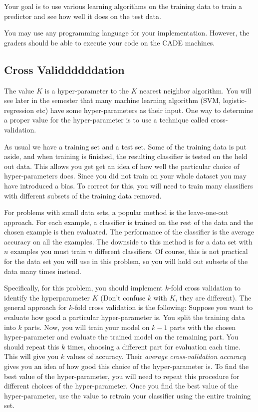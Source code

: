 \documentclass[listings, listings-bw, listings-color, listings-sv]{article}
\begin{document}
Your goal is to use various learning algorithms on the training data to train a predictor and see how well it does on the test data.

You may use any programming language for your implementation. However, the graders should be able to execute your code on the CADE machines.

\subsection{Cross Validdddddation}
\label{sec-3-1}

The value $K$ is a hyper-parameter to the $K$ nearest neighbor algorithm.  You will see later in the semester that many machine learning algorithm (SVM, logistic-regression etc) have some hyper-parameters as their input.  One way to determine a proper value for the hyper-parameter is to use a technique called cross-validation.

As usual we have a training set and a test set.  Some of the training data is put aside, and when training is finished,  the resulting classifier is tested on the held out data.  This allows you get get an idea of how well the particular choice of hyper-parameters does.  Since you did not train on your whole dataset you may have introduced a bias.  To correct for this, you will need to train many classifiers with different subsets of the training data removed.

For problems with small data sets, a popular method is the leave-one-out approach.  For each example, a classifier is trained on the rest of the data and the chosen example is then evaluated.   The  performance of  the  classifier  is  the  average  accuracy  on  all  the  examples. The downside to this method is for a data set with $n$ examples you must train $n$ different classifiers.  Of course, this is not practical for the data set you will use in this problem, so you will hold out subsets of the data many times instead.

Specifically, for this problem, you should implement $k$-fold cross validation to identify the hyperparameter $K$ (Don't confuse $k$ with $K$, they are different). The general approach for $k$-fold cross validation is the following: Suppose you want to evaluate how good a particular hyper-parameter is. You split the training data into $k$ parts. Now, you will train your model on $k-1$ parts with the chosen hyper-parameter and evaluate the trained model on the remaining part. You should repeat this $k$ times, choosing a different part for evaluation each time. This will give you $k$ values of accuracy. Their \emph{average cross-validation accuracy} gives you an idea of how good this choice of the hyper-parameter is. To find the best value of the hyper-parameter, you will need to repeat this procedure for different choices of the hyper-parameter. Once you find the best value of the hyper-parameter, use the value to retrain your classifier using the entire training set.
\end{document}
